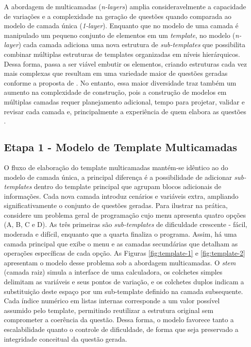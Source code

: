 A abordagem de multicamadas (\textit{n-layers}) amplia consideravelmente a capacidade de variações e a complexidade na geração de questões quando comparada ao modelo de camada única (\textit{1-layer}).  Enquanto que no modelo de uma camada é manipulado um pequeno conjunto de elementos em um \textit{template}, no modelo (\textit{n-layer}) cada camada adiciona uma nova estrutura de \textit{sub-templates} que possibilita combinar múltiplas estruturas de templates organizadas em níveis hierárquicos. Dessa forma, passa a ser viável embutir os elementos, criando estruturas cada vez mais complexas que resultam em uma variedade maior  de questões geradas conforme a proposta de  \parencite{lai2013}. No entanto, essa maior diversidade traz também um aumento na complexidade de construção, pois a construção de modelos em múltiplas camadas requer planejamento adicional, tempo para projetar, validar e revisar cada camada e, principalmente a experiência de quem elabora as questões \parencite{gierl2021}.  

\subsection{Etapa 1 - Modelo de Template Multicamadas }

O fluxo de elaboração do template multicamadas mantém‐se idêntico ao do modelo de camada única, a principal diferença é a possibilidade de adicionar \textit{sub-templates} dentro do template principal que agrupam blocos adicionais de informações. Cada nova camada introduz cenários e variáveis extra, ampliando significativamente o conjunto de questões geradas. Para ilustrar na prática, considere um problema geral de programação cujo menu apresenta quatro opções (A, B, C e D). As três primeiras são \textit{sub-templates} de dificuldade crescente - fácil, moderada e difícil, enquanto que a quarta finaliza o programa. Assim, há uma camada principal que exibe o menu e as camadas secundárias que detalham as operações específicas de cada opção. As Figuras \ref{fig:template-1} e \ref{fig:template-2} apresentam o modelo desse problema sob a abordagem multicamadas. O \textit{stem} (camada raiz) simula a interface de uma calculadora, os colchetes simples delimitam as variáveis e seus pontos de variação, e os colchetes duplos indicam a substituição deste espaço por um sub-template definido na camada subsequente. Cada índice numérico em listas internas corresponde a um valor possível assumido pelo template, permitindo reutilizar a estrutura original sem comprometer a coerência da questão. Dessa forma, o modelo favorece tanto a escalabilidade quanto o controle de dificuldade, de forma que seja preservado a integridade conceitual da questão gerada.

